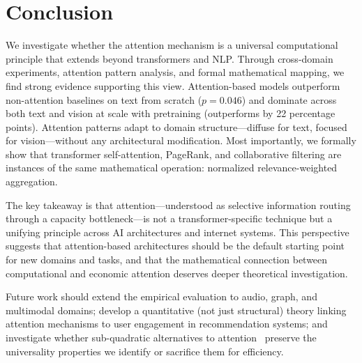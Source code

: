 \section{Conclusion}
\label{sec:conclusion}

We investigate whether the attention mechanism is a universal computational principle that extends beyond transformers and NLP. Through cross-domain experiments, attention pattern analysis, and formal mathematical mapping, we find strong evidence supporting this view. Attention-based models outperform non-attention baselines on text from scratch ($p{=}0.046$) and dominate across both text and vision at scale with pretraining (\vit outperforms \resnet by 22 percentage points). Attention patterns adapt to domain structure---diffuse for text, focused for vision---without any architectural modification. Most importantly, we formally show that transformer self-attention, PageRank, and collaborative filtering are instances of the same mathematical operation: normalized relevance-weighted aggregation.

The key takeaway is that attention---understood as selective information routing through a capacity bottleneck---is not a transformer-specific technique but a unifying principle across AI architectures and internet systems. This perspective suggests that attention-based architectures should be the default starting point for new domains and tasks, and that the mathematical connection between computational and economic attention deserves deeper theoretical investigation.

Future work should extend the empirical evaluation to audio, graph, and multimodal domains; develop a quantitative (not just structural) theory linking attention mechanisms to user engagement in recommendation systems; and investigate whether sub-quadratic alternatives to attention~\citep{gu2023mamba} preserve the universality properties we identify or sacrifice them for efficiency.
